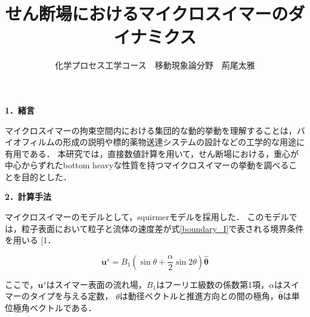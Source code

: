 \documentclass[twocolumns,10pt,a4j]{jarticle}
\title{\Large せん断場におけるマイクロスイマーのダイナミクス\vspace{-3truemm}}
\author{\large 化学プロセス工学コース　移動現象論分野　荊尾太雅\vspace{-10zh}}
\date{}
\makeatletter
\DeclareRobustCommand\cite{\unskip
  \@ifnextchar[{\@tempswatrue\@citex}{\@tempswafalse\@citex[]}}
\makeatother
\begin{document}



  \noindent
  \textbf{\large 1．緒言}
  \par
マイクロスイマーの拘束空間内における集団的な動的挙動を理解することは，バイオフィルムの形成の説明や標的薬物送達システムの設計などの工学的な用途に有用である．
本研究では，直接数値計算を用いて，せん断場における，重心が中心からずれたbottom heavyな性質を持つマイクロスイマーの挙動を調べることを目的とした．


  \noindent
  \textbf{\large 2．計算手法}
  \par
マイクロスイマーのモデルとして，squirmerモデルを採用した．
このモデルでは，粒子表面において粒子と流体の速度差が式\eqref{boundary_I}で表される境界条件を用いる\cite{1}．

  \vspace{-3truemm}
    \begin{equation}
      \boldsymbol{u}^s = B_1 \left( \sin{\theta} + \frac{\alpha}{2} \sin{2\theta} \right) \hat{\boldsymbol{\theta}}
      \label{boundary_I}
    \end{equation}
  \vspace{-4truemm}

  \noindent
ここで，$\boldsymbol{u}^s$はスイマー表面の流れ場，$B_1$はフーリエ級数の係数第1項，$\alpha$はスイマーのタイプを与える定数，
$\theta$は動径ベクトルと推進方向との間の極角，$\hat{\boldsymbol{\theta}}$は単位極角ベクトルである．
\end{document}
